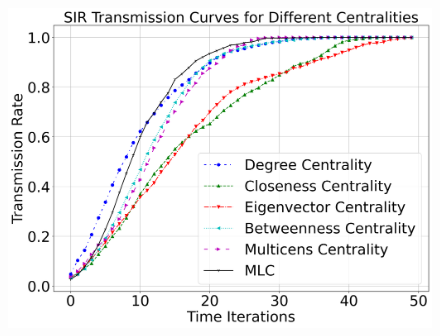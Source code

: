 \documentclass[10pt,letterpaper]{article}
\begin{document}
\begin{figure}[h!]
\begin{minipage}[b]{0.25\linewidth}
\subcaption{}
\end{minipage}
\hspace{0.5cm}
\begin{minipage}[b]{0.25\linewidth}
\centering
\includegraphics[width=\textwidth]{figs/fig19-hif1a_arnt-k2top2.png}
\subcaption{}
\end{minipage}

\vspace{0.5cm}


\end{figure}
\end{document}

